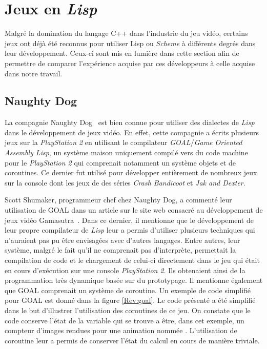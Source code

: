 \documentclass[12pt,twoside,letterpaper,francais]{book}
\newcommand{\lisp}{{\textit{Lisp }}}
\newcommand{\Schemelang}{{\textit{Scheme }}}
\newcommand{\scheme}[1]{\selectlanguage{english}{\tt #1}\selectlanguage{french}}
\begin{document}
\FloatBarrier
\section{Jeux en \lisp}
Malgré la domination du langage C++ dans l'industrie du jeu vidéo,
certains jeux ont déjà été reconnus pour utiliser Lisp ou \Schemelang à
différents degrés dans leur développement. Ceux-ci sont mis en lumière
dans cette section afin de permettre de comparer l'expérience acquise
par ces développeurs à celle acquise dans notre travail.


\FloatBarrier
\subsection{Naughty Dog}
La compagnie Naughty Dog~\cite{ND} est bien connue pour utiliser des
dialectes de \lisp dans le développement de jeux vidéo. En effet,
cette compagnie a écrits plusieurs jeux sur la \textit{PlayStation 2}
en utilisant le compilateur \textit{GOAL}/\textit{Game Oriented
  Assembly Lisp}, un système maison uniquement compilé vers du code
machine pour le \textit{PlayStation 2} qui comprenait notamment un
système objets et de coroutines. Ce dernier fut utilisé pour
développer entièrement de nombreux jeux sur la console dont les jeux
de des séries \textit{Crash Bandicoot} et \textit{Jak and Dexter}.

Scott Shumaker, programmeur chef chez Naughty Dog, a commenté leur
utilisation de GOAL dans un article sur le site web consacré au
développement de jeux vidéo Gamasutra~\cite{ND_GOAL}. Dans ce dernier,
il mentionne que le développement de leur propre compilateur de \lisp
leur a permis d'utiliser plusieurs techniques qui n'auraient pas pu
être envisagées avec d'autres langages. Entre autres, leur système,
malgré le fait qu'il ne comprenait pas d'interprète, permettait la
compilation de code et le chargement de celui-ci directement dans le
jeu qui était en cours d'exécution sur une console \textit{PlayStation
  2}. Ils obtenaient ainsi de la programmation très dynamique basée
sur du prototypage. Il mentionne également que GOAL comprenait un
système de coroutine. Un exemple de code simplifié pour GOAL est donné
dans la figure \ref{Rev:goal}. Le code présenté a été simplifié dans
le but d'illustrer l'utilisation des coroutines de ce jeu. On constate
que le code conserve l'état de la variable \scheme{ii} qui se trouve a
être, dans cet exemple, un compteur d'images rendues pour une
animation nommée \scheme{idle}. L'utilisation de coroutine leur a
permis de conserver l'état du calcul en cours de manière triviale.\\
\end{document}
